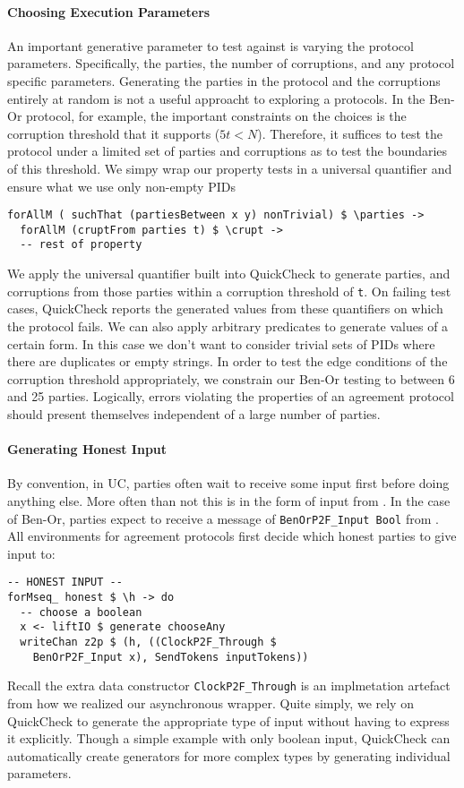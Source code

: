 \paragraph{Choosing Execution Parameters}
An important generative parameter to test against is varying the protocol parameters. Specifically, the parties, the number of corruptions, and any protocol specific parameters.
Generating the parties in the protocol and the corruptions entirely at random is not a useful approacht to exploring a protocols.
In the Ben-Or protocol, for example, the important constraints on the choices is the corruption threshold that it supports ($5t < N$).
Therefore, it suffices to test the protocol under a limited set of parties and corruptions as to test the boundaries of this threshold.
We simpy wrap our property tests in a universal quantifier and ensure what we use only non-empty PIDs
\begin{lstlisting}
forAllM ( suchThat (partiesBetween x y) nonTrivial) $ \parties -> 
  forAllM (cruptFrom parties t) $ \crupt ->
  -- rest of property
\end{lstlisting}
We apply the universal quantifier built into QuickCheck to generate parties, and corruptions from those parties within a corruption threshold of \texttt{t}.
On failing test cases, QuickCheck reports the generated values from these quantifiers on which the protocol fails.
We can also apply arbitrary predicates to generate values of a certain form. In this case we don't want to consider trivial sets of PIDs where there are duplicates or empty strings. 
In order to test the edge conditions of the corruption threshold appropriately, we constrain our Ben-Or testing to between 6 and 25 parties. 
Logically, errors violating the properties of an agreement protocol should present themselves independent of a large number of parties.

\paragraph{Generating Honest Input}
By convention, in UC, parties often wait to receive some input first before doing anything else. More often than not this is in the form of input from \Z.
In the case of Ben-Or, parties expect to receive a message of \texttt{BenOrP2F\_Input Bool} from \Z.
All environments for agreement protocols first decide which honest parties to give input to:
\begin{lstlisting}
-- HONEST INPUT --
forMseq_ honest $ \h -> do
  -- choose a boolean
  x <- liftIO $ generate chooseAny
  writeChan z2p $ (h, ((ClockP2F_Through $ 
    BenOrP2F_Input x), SendTokens inputTokens))
\end{lstlisting}
Recall the extra data constructor \texttt{ClockP2F\_Through} is an implmetation artefact from how we realized our asynchronous wrapper.
Quite simply, we rely on QuickCheck to generate the appropriate type of input without having to express it explicitly. 
Though a simple example with only boolean input, QuickCheck can automatically create generators for more complex types by generating individual parameters. 

